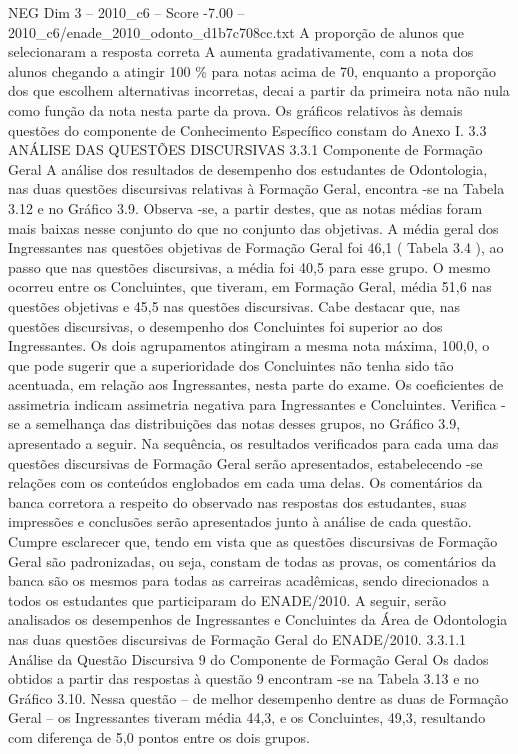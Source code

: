 \begin{textsample}{NEG Dim 3 – 2010\_c6 – Score -7.00 – 2010\_c6/enade\_2010\_odonto\_d1b7c708cc.txt}
A proporção de alunos que selecionaram a resposta correta A aumenta gradativamente, com a nota dos alunos chegando a atingir 100 \% para notas acima de 70, enquanto a proporção dos que escolhem alternativas incorretas, decai a partir da primeira nota não nula como função da nota nesta parte da prova.
Os gráficos relativos às demais questões do componente de Conhecimento Específico constam do Anexo I. 3.3 ANÁLISE DAS QUESTÕES DISCURSIVAS 3.3.1 Componente de Formação Geral A análise dos resultados de desempenho dos estudantes de Odontologia, nas duas questões discursivas relativas à Formação Geral, encontra -se na Tabela 3.12 e no Gráfico 3.9.
Observa -se, a partir destes, que as notas médias foram mais baixas nesse conjunto do que no conjunto das objetivas.
A média geral dos Ingressantes nas questões objetivas de Formação Geral foi 46,1 ( Tabela 3.4 ), ao passo que nas questões discursivas, a média foi 40,5 para esse grupo.
O mesmo ocorreu entre os Concluintes, que tiveram, em Formação Geral, média 51,6 nas questões objetivas e 45,5 nas questões discursivas.
Cabe destacar que, nas questões discursivas, o desempenho dos Concluintes foi superior ao dos Ingressantes.
Os dois agrupamentos atingiram a mesma nota máxima, 100,0, o que pode sugerir que a superioridade dos Concluintes não tenha sido tão acentuada, em relação aos Ingressantes, nesta parte do exame.
Os coeficientes de assimetria indicam assimetria negativa para Ingressantes e Concluintes.
Verifica -se a semelhança das distribuições das notas desses grupos, no Gráfico 3.9, apresentado a seguir.
Na sequência, os resultados verificados para cada uma das questões discursivas de Formação Geral serão apresentados, estabelecendo -se relações com os conteúdos englobados em cada uma delas.
Os comentários da banca corretora a respeito do observado nas respostas dos estudantes, suas impressões e conclusões serão apresentados junto à análise de cada questão.
Cumpre esclarecer que, tendo em vista que as questões discursivas de Formação Geral são padronizadas, ou seja, constam de todas as provas, os comentários da banca são os mesmos para todas as carreiras acadêmicas, sendo direcionados a todos os estudantes que participaram do ENADE/2010.
A seguir, serão analisados os desempenhos de Ingressantes e Concluintes da Área de Odontologia nas duas questões discursivas de Formação Geral do ENADE/2010. 3.3.1.1 Análise da Questão Discursiva 9 do Componente de Formação Geral Os dados obtidos a partir das respostas à questão 9 encontram -se na Tabela 3.13 e no Gráfico 3.10.
Nessa questão – de melhor desempenho dentre as duas de Formação Geral – os Ingressantes tiveram média 44,3, e os Concluintes, 49,3, resultando com diferença de 5,0 pontos entre os dois grupos.

\end{textsample}
